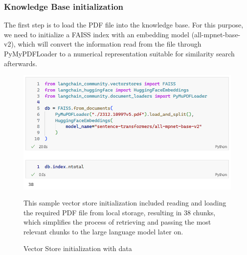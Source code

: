 \subsubsection{Knowledge Base initialization}
The first step is to load the PDF file into the knowledge base. For this purpose, we need to initialize a FAISS index with an embedding model (all-mpnet-base-v2), which will convert the information read from the file through PyMyPDFLoader to a numerical representation suitable for similarity search afterwards.
\begin{figure}[H]
    \centering
    \includegraphics[width=\linewidth]{./figures/vectorstore_init.png}
    \caption{Vector Store initialization with data}
    \begin{flushleft}
        \small This sample vector store initialization included reading and loading the required PDF file from local storage, resulting in 38 chunks, which simplifies the process of retrieving and passing the most relevant chunks to the large language model later on.
    \end{flushleft}
\end{figure}

